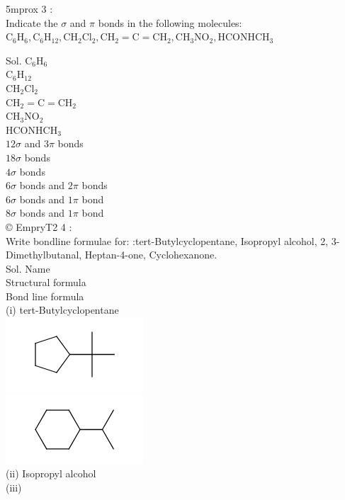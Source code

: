 \documentclass[10pt]{article}
\begin{document}
5mprox 3 :\\
Indicate the $\sigma$ and $\pi$ bonds in the following molecules: $\mathrm{C}_{6} \mathrm{H}_{6}, \mathrm{C}_{6} \mathrm{H}_{12}, \mathrm{CH}_{2} \mathrm{Cl}_{2}, \mathrm{CH}_{2}=\mathrm{C}=\mathrm{CH}_{2}, \mathrm{CH}_{3} \mathrm{NO}_{2}, \mathrm{HCONHCH}_{3}$

Sol. $\mathrm{C}_{6} \mathrm{H}_{6}$\\
$\mathrm{C}_{6} \mathrm{H}_{12}$\\
$\mathrm{CH}_{2} \mathrm{Cl}_{2}$\\
$\mathrm{CH}_{2}=\mathrm{C}=\mathrm{CH}_{2}$\\
$\mathrm{CH}_{3} \mathrm{NO}_{2}$\\
$\mathrm{HCONHCH}_{3}$\\
$12 \sigma$ and $3 \pi$ bonds\\
$18 \sigma$ bonds\\
$4 \sigma$ bonds\\
$6 \sigma$ bonds and $2 \pi$ bonds\\
$6 \sigma$ bonds and $1 \pi$ bond\\
$8 \sigma$ bonds and $1 \pi$ bond\\
© EmpryT2 4 :\\
Write bondline formulae for: :tert-Butylcyclopentane, Isopropyl alcohol, 2, 3-Dimethylbutanal, Heptan-4-one, Cyclohexanone.\\
Sol. Name\\
Structural formula\\
Bond line formula\\
(i) tert-Butylcyclopentane\\
\includegraphics{smile-c28f8e1b1c0442c3bacbb30efdb45de09f21f273}\\
\includegraphics{smile-14bbf87583ceb0d93851285085ea4b5e74a776a3}\\
(ii) Isopropyl alcohol\\
(iii)
\end{document}
